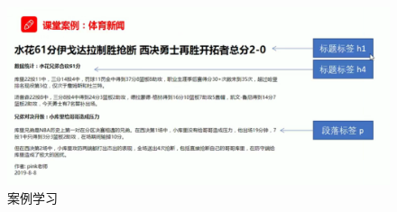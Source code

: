 \documentclass[
]{book}
\begin{document}
\begin{figure}

{\centering \includegraphics{fig/1-7} 

}

\caption{案例学习}\label{fig:unnamed-chunk-10}
\end{figure}
\end{document}
